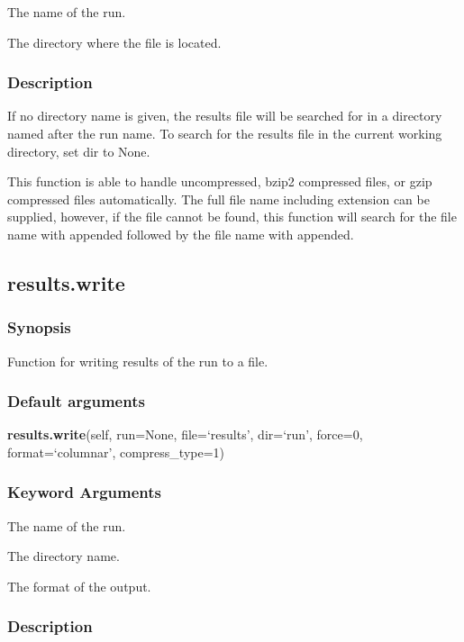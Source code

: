   The name of the run.

  The directory where the file is located.

\subsubsection{Description}

If no directory name is given, the results file will be searched for in a directory named
after the run name.  To search for the results file in the current working directory, set
dir to None.

This function is able to handle uncompressed, bzip2 compressed files, or gzip compressed
files automatically.  The full file name including extension can be supplied, however, if
the file cannot be found, this function will search for the file name with 
 appended
followed by the file name with 
 appended.


\newpage

\subsection{results.write}


\subsubsection{Synopsis}

Function for writing results of the run to a file.

\subsubsection{Default arguments}

\textsf{\textbf{results.write}(self, run=None, file=`results', dir=`run', force=0, format=`columnar', compress\_type=1)}


\subsubsection{Keyword Arguments}

  The name of the run.

  The directory name.

  The format of the output.


\subsubsection{Description}

